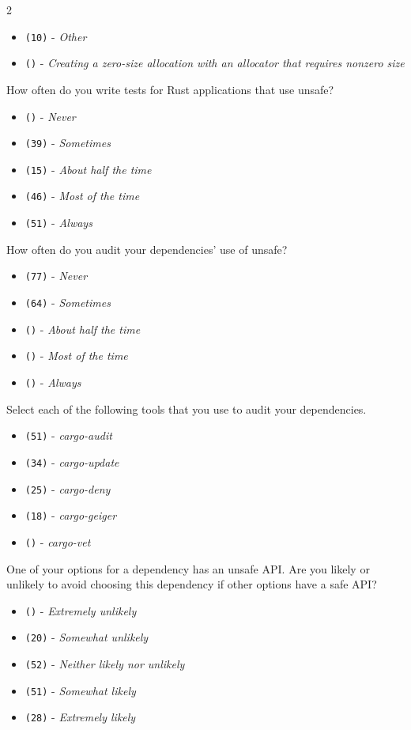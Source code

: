 \begin{protocol}
\begin{multicols}{2}
\begin{itemize}
\item \texttt{(10)} - \textit{Other}
\item \texttt{()} - \textit{Creating a zero-size allocation with an allocator that requires nonzero size}
\end{itemize}
\end{multicols}
\item \label{survey:vq6}  How often do you write tests for Rust applications that use unsafe?
\begin{itemize}
\item \texttt{()} - \textit{Never}
\item \texttt{(39)} - \textit{Sometimes}
\item \texttt{(15)} - \textit{About half the time}
\item \texttt{(46)} - \textit{Most of the time}
\item \texttt{(51)} - \textit{Always}
\end{itemize}
\item \label{survey:vq7}  How often do you audit your dependencies' use of unsafe?
\begin{itemize}
\item \texttt{(77)} - \textit{Never}
\item \texttt{(64)} - \textit{Sometimes}
\item \texttt{()} - \textit{About half the time}
\item \texttt{()} - \textit{Most of the time}
\item \texttt{()} - \textit{Always}
\end{itemize}
\item \label{survey:vq8}  Select each of the following tools that you use to audit your dependencies.
\begin{itemize}
\item \texttt{(51)} - \textit{cargo-audit}
\item \texttt{(34)} - \textit{cargo-update}
\item \texttt{(25)} - \textit{cargo-deny}
\item \texttt{(18)} - \textit{cargo-geiger}
\item \texttt{()} - \textit{cargo-vet}
\end{itemize}
\item \label{survey:vq9}  One of your options for a dependency has an unsafe API. Are you likely or unlikely to avoid choosing this dependency if other options have a safe API?
\begin{itemize}
\item \texttt{()} - \textit{Extremely unlikely}
\item \texttt{(20)} - \textit{Somewhat unlikely}
\item \texttt{(52)} - \textit{Neither likely nor unlikely}
\item \texttt{(51)} - \textit{Somewhat likely}
\item \texttt{(28)} - \textit{Extremely likely}
\end{itemize}
\end{protocol}

